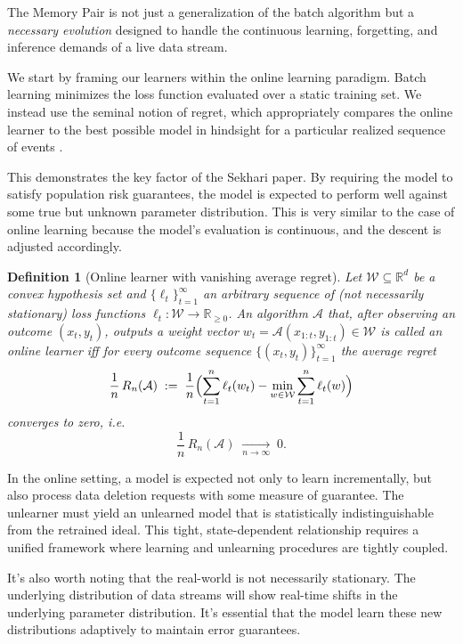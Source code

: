 \documentclass[a4paper,12pt]{article}
\newtheorem{definition}[theorem]{Definition}
\begin{document}
The Memory Pair is not just a generalization of the batch algorithm but a \textit{necessary evolution} designed to handle the continuous learning, forgetting, and inference demands of a live data stream.

We start by framing our learners within the online learning paradigm. Batch learning  minimizes the loss function evaluated over a static training set. We instead use the seminal notion of regret, which appropriately compares the online learner to the best possible model in hindsight for a particular realized sequence of events \cite{Cesa-Bianchi_Lugosi_2006}.

This demonstrates the key factor of the Sekhari paper. By requiring the model to satisfy population risk guarantees, the model is expected to perform well against some true but unknown parameter distribution. This is very similar to the case of online learning because the model's evaluation is continuous, and the descent is adjusted accordingly.

\begin{definition}[Online learner with vanishing average regret]
\label{def:online-learner}
Let $\mathcal W \subseteq \mathbb{R}^d$ be a convex hypothesis set and $\{\ell_t\}_{t=1}^\infty$ an arbitrary sequence of (not necessarily stationary) loss functions $\ell_t : \mathcal W \to \mathbb{R}_{\ge 0}$. An algorithm $\mathcal A$ that, after observing an outcome $(x_{t},y_{t})$, outputs a weight vector $w_t = \mathcal A(x_{1:t},y_{1:t}) \in \mathcal W$ is called an \emph{online learner} iff for every outcome sequence $\{(x_{t},y_{t})\}_{t=1}^\infty$ the \emph{average regret}
\[
  \frac{1}{n}\,R_n(\mathcal A)
  \;:=\;
  \frac{1}{n}
  \Bigl(
    \sum_{t=1}^{n}\ell_t(w_t)
    -
    \min_{w\in\mathcal W}\sum_{t=1}^{n}\ell_t(w)
  \Bigr)
\]
converges to zero,
i.e.
\[
  \frac{1}{n}\,R_n(\mathcal A)
  \;\xrightarrow[n\to\infty]{}\;0.
\]
\end{definition}

In the online setting, a model is expected not only to learn incrementally, but also process data deletion requests with some measure of guarantee. The unlearner must yield an unlearned model that is statistically indistinguishable from the retrained ideal. This tight, state-dependent relationship requires a unified framework where learning and unlearning procedures are tightly coupled.

It's also worth noting that the real-world is not necessarily stationary. The underlying distribution of data streams will show real-time shifts in the underlying parameter distribution. It's essential that the model learn these new distributions adaptively to maintain error guarantees.
\end{document}
